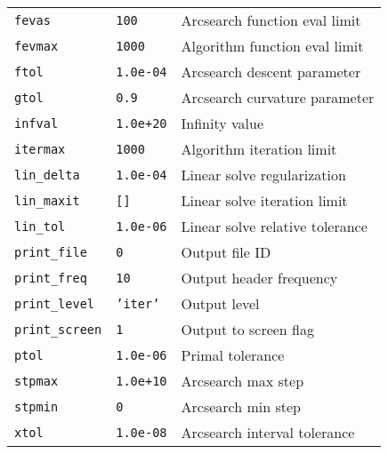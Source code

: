 \documentclass[11pt]{article}
\begin{document}
\begin{center}
\begin{tabular}{|l|l|l|}
 \texttt{fevas}          &  \texttt{100}         &  Arcsearch function eval limit        \\
 \texttt{fevmax}         &  \texttt{1000}        &  Algorithm function eval limit        \\
 \texttt{ftol}           &  \texttt{1.0e-04}     &  Arcsearch descent parameter          \\
 \texttt{gtol}           &  \texttt{0.9}         &  Arcsearch curvature parameter        \\
 \texttt{infval}         &  \texttt{1.0e+20}     &  Infinity value                       \\
 \texttt{itermax}        &  \texttt{1000}        &  Algorithm iteration limit            \\
 \texttt{lin\_delta}     &  \texttt{1.0e-04}     &  Linear solve regularization          \\
 \texttt{lin\_maxit}     &  \texttt{[]}          &  Linear solve iteration limit         \\
 \texttt{lin\_tol}       &  \texttt{1.0e-06}     &  Linear solve relative tolerance      \\
 \texttt{print\_file}    &  \texttt{0}           &  Output file ID                       \\
 \texttt{print\_freq}    &  \texttt{10}          &  Output header frequency              \\
 \texttt{print\_level}   &  \texttt{'iter'}      &  Output level                         \\
 \texttt{print\_screen}  &  \texttt{1}           &  Output to screen flag                \\
 \texttt{ptol}           &  \texttt{1.0e-06}     &  Primal tolerance                     \\
 \texttt{stpmax}         &  \texttt{1.0e+10}     &  Arcsearch max step                   \\
 \texttt{stpmin}         &  \texttt{0}           &  Arcsearch min step                   \\
 \texttt{xtol}           &  \texttt{1.0e-08}     &  Arcsearch interval tolerance         \\
\hline
\end{tabular}
\end{center}
\end{document}
